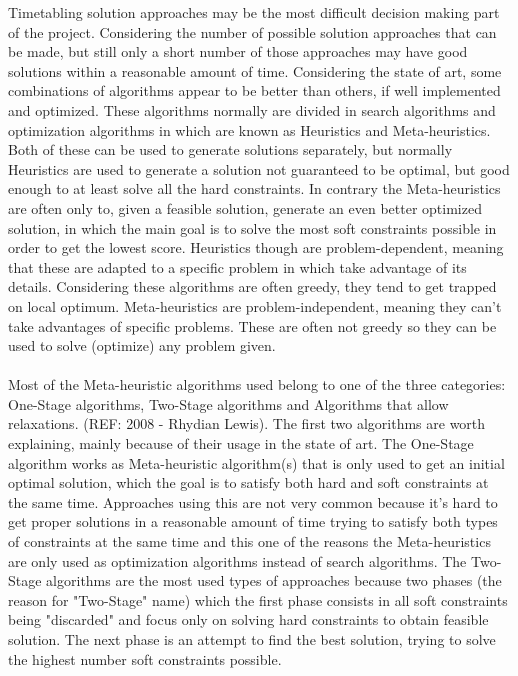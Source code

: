 Timetabling solution approaches may be the most difficult decision making part of the project. Considering the number of possible solution approaches that can be made, but still only a short number of those approaches may have good solutions within a reasonable amount of time. Considering the state of art, some combinations of algorithms appear to be better than others, if well implemented and optimized. These algorithms normally are divided in search algorithms and optimization algorithms in which are known as Heuristics and Meta-heuristics. Both of these can be used to generate solutions separately, but normally Heuristics are used to generate a solution not guaranteed to be optimal, but good enough to at least solve all the hard constraints. In contrary the Meta-heuristics are often only to, given a feasible solution, generate an even better optimized solution, in which the main goal is to solve the most soft constraints possible in order to get the lowest score. Heuristics though are problem-dependent, meaning that these are adapted to a specific problem in which take advantage of its details. Considering these algorithms are often greedy, they tend to get trapped on local optimum. Meta-heuristics are problem-independent, meaning they can't take advantages of specific problems. These are often not greedy so they can be used to solve (optimize) any problem given.\\
\\
Most of the Meta-heuristic algorithms used belong to one of the three categories: One-Stage algorithms, Two-Stage algorithms and Algorithms that allow relaxations. (REF: 2008 - Rhydian Lewis). The first two algorithms are worth explaining, mainly because of their usage in the state of art. The One-Stage algorithm works as Meta-heuristic algorithm(s) that is only used to get an initial optimal solution, which the goal is to satisfy both hard and soft constraints at the same time. Approaches using this are not very common because it's hard to get proper solutions in a reasonable amount of time trying to satisfy both types of constraints at the same time and this one of the reasons the Meta-heuristics are only used as optimization algorithms instead of search algorithms. The Two-Stage algorithms are the most used types of approaches because two phases (the reason for "Two-Stage" name) which the first phase consists in all soft constraints being "discarded" and focus only on solving hard constraints to obtain feasible solution. The next phase is an attempt to find the best solution, trying to solve the highest number soft constraints possible.\\
